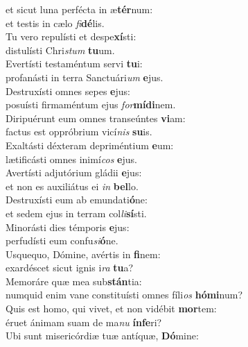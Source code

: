 \evenverse  et sicut luna perfécta in æ\textbf{tér}num:~\*\\
\evenverse et testis in cælo \textit{fi}\textbf{dé}lis.\\
\oddverse Tu vero repulísti et despe\textbf{xí}sti:~\*\\
\oddverse distulísti Chri\textit{stum} \textbf{tu}um.\\
\evenverse Evertísti testaméntum servi \textbf{tu}i:~\*\\
\evenverse profanásti in terra Sanctuári\textit{um} \textbf{e}jus.\\
\oddverse Destruxísti omnes sepes \textbf{e}jus:~\*\\
\oddverse posuísti firmaméntum ejus \textit{for}\textbf{mí}\textbf{di}nem.\\
\evenverse Diripuérunt eum omnes transeúntes \textbf{vi}am:~\*\\
\evenverse factus est oppróbrium vicí\textit{nis} \textbf{su}is.\\
\oddverse Exaltásti déxteram depriméntium \textbf{e}um:~\*\\
\oddverse lætificásti omnes inimí\textit{cos} \textbf{e}jus.\\
\evenverse Avertísti adjutórium gládii \textbf{e}jus:~\*\\
\evenverse et non es auxiliátus ei \textit{in} \textbf{bel}lo.\\
\oddverse Destruxísti eum ab emundati\textbf{ó}ne:~\*\\
\oddverse et sedem ejus in terram col\textit{li}\textbf{sí}sti.\\
\evenverse Minorásti dies témporis \textbf{e}jus:~\*\\
\evenverse perfudísti eum confu\textit{si}\textbf{ó}ne.\\
\oddverse Usquequo, Dómine, avértis in \textbf{fi}nem:~\*\\
\oddverse exardéscet sicut ignis i\textit{ra} \textbf{tu}a?\\
\evenverse Memoráre quæ mea sub\textbf{stán}tia:~\*\\
\evenverse numquid enim vane constituísti omnes fíli\textit{os} \textbf{hó}\textbf{mi}num?\\
\oddverse Quis est homo, qui vivet, et non vidébit \textbf{mor}tem:~\*\\
\oddverse éruet ánimam suam de ma\textit{nu} \textbf{ín}\textbf{fe}ri?\\
\evenverse Ubi sunt misericórdiæ tuæ antíquæ, \textbf{Dó}mine:~\*\\
